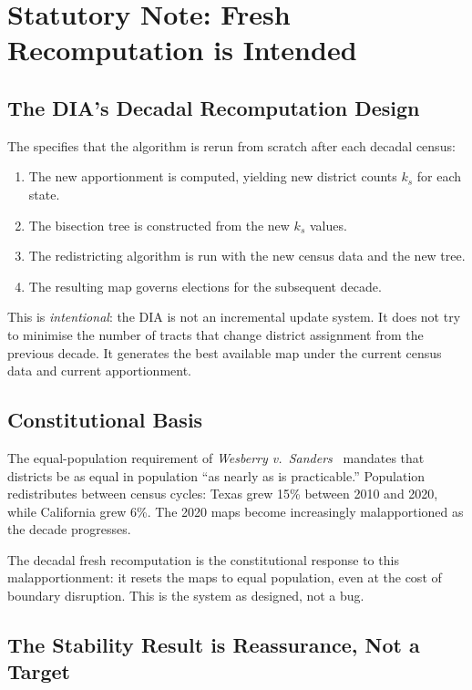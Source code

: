 \section{Statutory Note: Fresh Recomputation is Intended}
\label{sec:statutory}

\subsection{The DIA's Decadal Recomputation Design}

The \dia{} specifies that the \ar{} algorithm is rerun from scratch
after each decadal census:
\begin{enumerate}
\item The new \hh{} apportionment is computed, yielding new district
      counts $k_s$ for each state.
\item The \ar{} bisection tree is constructed from the new $k_s$ values.
\item The redistricting algorithm is run with the new census data and
      the new tree.
\item The resulting map governs elections for the subsequent decade.
\end{enumerate}

This is \emph{intentional}: the DIA is not an incremental update system.
It does not try to minimise the number of tracts that change district
assignment from the previous decade.
It generates the best available map under the current census data and
current apportionment.

\subsection{Constitutional Basis}

The equal-population requirement of \textit{Wesberry v.\ Sanders}~\citep{wesberry1964}
mandates that districts be as equal in population ``as nearly as is
practicable.''
Population redistributes between census cycles: Texas grew 15\% between
2010 and 2020, while California grew 6\%.
The 2020 maps become increasingly malapportioned as the decade progresses.

The decadal fresh recomputation is the constitutional response to this
malapportionment: it resets the maps to equal population, even at the
cost of boundary disruption.
This is the system as designed, not a bug.

\subsection{The Stability Result is Reassurance, Not a Target}

